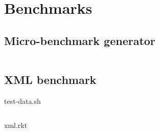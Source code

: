 \chapter{Benchmarks}
\label{chap:benchmarks}

\section{Micro-benchmark generator}
\inputminted{racket}{listings/comp.rkt}

\section{XML benchmark}
test-data.sh
\inputminted{bash}{listings/test-data.sh}
\noindent
xml.rkt
\inputminted{racket}{listings/xml.rkt}
